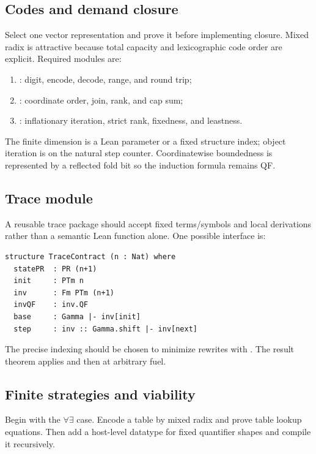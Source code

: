 \subsection{Codes and demand closure}

Select one vector representation and prove it before implementing closure.  Mixed radix is attractive because total capacity and lexicographic code order are explicit.  Required modules are:

\begin{enumerate}
\item {}: digit, encode, decode, range, and round trip;
\item {}: coordinate order, join, rank, and cap sum;
\item {}: inflationary iteration, strict rank, fixedness, and leastness.
\end{enumerate}

The finite dimension is a Lean parameter or a fixed structure index; object iteration is on the natural step counter.  Coordinatewise boundedness is represented by a reflected fold bit so the induction formula remains QF.

\subsection{Trace module}

A reusable trace package should accept fixed terms/symbols and local derivations rather than a semantic Lean function alone.  One possible interface is:

\begin{lstlisting}
structure TraceContract (n : Nat) where
  statePR  : PR (n+1)
  init     : PTm n
  inv      : Fm PTm (n+1)
  invQF    : inv.QF
  base     : Gamma |- inv[init]
  step     : inv :: Gamma.shift |- inv[next]
\end{lstlisting}

The precise indexing should be chosen to minimize rewrites with .  The result theorem applies  and then  at arbitrary fuel.

\subsection{Finite strategies and viability}

Begin with the \(\forall\exists\) case.  Encode a table by mixed radix and prove table lookup equations.  Then add a host-level datatype for fixed quantifier shapes and compile it recursively.

